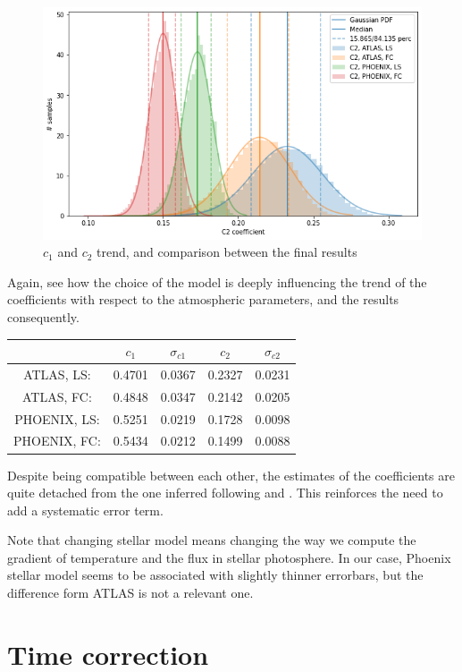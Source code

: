 \documentclass[a4paper,11pt,twocolumn]{article}
\begin{document}
\begin{figure}[H]
    \includegraphics[scale=0.35, angle=0]{../pictures/Claret2011/c2_comp.png}
    \caption{$c_1$ and $c_2$ trend, and comparison between the final results}
\end{figure}
Again, see how the choice of the model is deeply influencing the trend of 
the coefficients with respect to the atmospheric parameters, and the results 
consequently. 
\begin{table}[h!]
	\centering
	\begin{tabular}{ccccc}
		\hline
		& $c_1$ & $\sigma_{c1}$ & $c_2$ & $\sigma_{c2}$\\
		\hline
		ATLAS, LS:      & 0.4701 & 0.0367 &0.2327 &0.0231 \\
		ATLAS, FC:      & 0.4848 & 0.0347 & 0.2142 &  0.0205 \\
		PHOENIX, LS:    & 0.5251 & 0.0219 & 0.1728 & 0.0098 \\
		PHOENIX, FC:    & 0.5434 & 0.0212 &  0.1499 & 0.0088 \\
        \hline
	\end{tabular} 
\end{table}
Despite being compatible between each other, the estimates of 
the coefficients are quite detached from the one inferred following 
\cite{claret2017} and \cite{claret2018}. This reinforces the need to add 
a systematic error term. 


Note that changing stellar model means changing the
way we compute the gradient of temperature
and the flux in stellar photosphere. 
In our case, Phoenix stellar model seems to be associated with 
slightly thinner errorbars, but the difference form ATLAS is not 
a relevant one.





\section{Time correction}
\label{sect:app_B}
\end{document}

